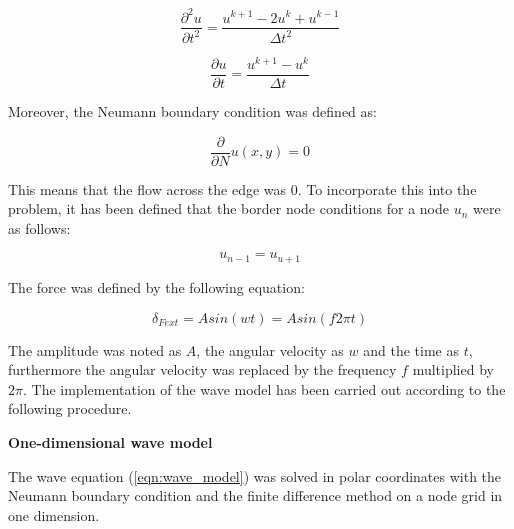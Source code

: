 \documentclass[12pt, a4paper]{article} %
\begin{document}
\begin{equation} \label{eqn:deltau_deltat2}
   \frac{\partial^{2}u}{\partial t^{2}} = \frac{u^{k + 1} - 2u^{k} + u^{k - 1}}{\Delta t^{2}} 
\end{equation}

\begin{equation} \label{eqn:deltau_deltat}
   \frac{\partial u}{\partial t} = \frac{u^{k + 1} - u^{k}}{\Delta t}
\end{equation}

Moreover, the Neumann boundary condition was defined as:

\begin{equation} \label{eqn:neumann}
 \frac{\partial}{\partial N} u(x, y) = 0
\end{equation}

This means that the flow across the edge was 0. To incorporate this into the problem, it has been defined that the border node conditions for a node $u_{n}$ were as follows:

\begin{equation} \label{eqn:neumman_node}
    u_{n-1} = u_{u+1}
\end{equation}

The force was defined by the following equation:

\begin{equation} \label{eqn:force}
    \delta_{Fext} = Asin(wt) = Asin(f2\pi t)
\end{equation}

The amplitude was noted as $A$, the angular velocity as $w$ and the time as $t$, furthermore the angular velocity was replaced by the frequency $f$ multiplied by $2\pi$. The implementation of the wave model has been carried out according to the following procedure.

\setlength{\parindent}{0pt}

\setlength{\parskip}{8mm}

\textbf{One-dimensional wave model}
\normalsize 

\setlength{\parskip}{0mm}

The wave equation (\ref{eqn:wave_model}) was solved in polar coordinates with the Neumann boundary condition and the finite difference method on a node grid in one dimension. 

\setlength{\parindent}{8pt}
\setlength{\parskip}{4mm}
\end{document}
